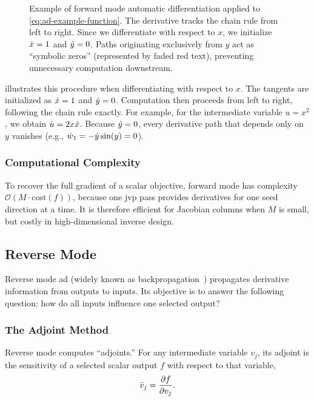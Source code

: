 \begin{figure}
  \centering
  \caption{Example of forward mode automatic differentiation applied to \eqref{eq:ad-example-function}. The derivative tracks the chain rule from left to right. Since we differentiate with respect to $x$, we initialize $\dot{x} = 1$ and $\dot{y} = 0$. Paths originating exclusively from $y$ act as \enquote{symbolic zeros} (represented by faded red text), preventing unnecessary computation downstream.}
\end{figure}

 illustrates this procedure when differentiating with respect to $x$. The tangents are initialized as $\dot{x}=1$ and $\dot{y}=0$. Computation then proceeds from left to right, following the chain rule exactly. For example, for the intermediate variable $u=x^2$, we obtain $\dot{u}=2x\dot{x}$. Because $\dot{y}=0$, every derivative path that depends only on $y$ vanishes (e.g., $\dot{w}_1=-\dot{y}\sin(y)=0$).

\subsubsection{Computational Complexity}

To recover the full gradient of a scalar objective, forward mode has complexity $\mathcal{O}(M\cdot\text{cost}(f))$, because one \gls{jvp} pass provides derivatives for one seed direction at a time. It is therefore efficient for Jacobian columns when $M$ is small, but costly in high-dimensional inverse design.

\subsection{Reverse Mode}

Reverse mode \gls{ad} (widely known as backpropagation~) propagates derivative information from outputs to inputs. Its objective is to answer the following question: how do all inputs influence one selected output?

\subsubsection{The Adjoint Method}

Reverse mode computes \enquote{adjoints.} For any intermediate variable $v_j$, its adjoint is the sensitivity of a selected scalar output $f$ with respect to that variable,
\begin{equation}
  \bar{v}_j = \frac{\partial f}{\partial v_j}.
\end{equation}


